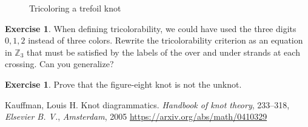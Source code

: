 \documentclass{article}
\theoremstyle{definition}
\newtheorem{exer}[thm]{Exercise}
\theoremstyle{remark}
\newcommand{\Z}{\mathbb Z}
\begin{document}
\begin{figure}[h]
	\caption{Tricoloring a trefoil knot}
	\label{fig:tricolor trefoil}
\end{figure}

\begin{exer}
	When defining tricolorability, we could have used the three digits $0, 1, 2$ instead of three colors. Rewrite the tricolorability criterion as an equation in $\Z_3$ that must be satisfied by the labels of the over and under strands at each crossing. Can you generalize?
\end{exer}

\begin{exer}
	Prove that the figure-eight knot is not the unknot.
\end{exer}

\begin{thebibliography}{99}
	 Kauffman, Louis H. Knot diagrammatics. \emph{Handbook of knot theory}, 233–318, \emph{Elsevier B. V.}, \emph{Amsterdam}, 2005 \href{https://arxiv.org/abs/math/0410329}{https://arxiv.org/abs/math/0410329}
\end{thebibliography}
\end{document}
